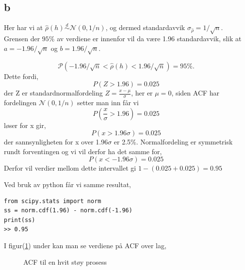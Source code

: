 \documentclass[10pt]{article}
\begin{document}
{\subsection{b}

Her har vi at $\hat{\rho}(h) \stackrel {d}{\sim}  \mathcal{N}(0,1/n)$, og dermed standardavvik $\sigma_{\hat{\rho}} = 1/\sqrt{n}$. Grensen der $95\%$ av verdiene er innenfor vil da være 1.96 standardavvik,
slik at $a = -1.96/\sqrt{n}$ og $b = 1.96/\sqrt{n}$.

\begin{equation}
  \mathcal{P}(-1.96/\sqrt{n} < \hat{\rho}(h) < 1.96/\sqrt{n}) = 95\%.
\end{equation}
Dette fordi,
\begin{equation*}
  P(Z > 1.96) = 0.025
\end{equation*}
der Z er standardnormalfordeling $Z = \frac{x - \mu}{\sigma}$, her er $\mu = 0$, siden ACF har fordelingen $\mathcal{N}(0,1/n)$
setter man inn får vi
\begin{equation*}
  P(\frac{x}{\sigma} > 1.96) = 0.025
\end{equation*}
løser for x gir,
\begin{equation*}
  P(x > 1.96\sigma) = 0.025
\end{equation*}
der sannsynligheten for x over 1.96$\sigma$ er 2.5\%.
Normalfordeling er symmetrisk rundt forventingen og vi vil derfor ha det samme for,
\begin{equation*}
  P(x < -1.96\sigma) = 0.025
\end{equation*}
Derfor vil verdier mellom dette intervallet gi $1 - (0.025 + 0.025)  = 0.95$

Ved bruk av python får vi samme resultat,
\begin{lstlisting}
from scipy.stats import norm
ss = norm.cdf(1.96) - norm.cdf(-1.96)
print(ss)
>> 0.95
\end{lstlisting}

I figur(\ref{ACF}) under kan man se verdiene på ACF over lag,

\begin{figure}[hbt!]
\caption{ACF til en hvit støy prosess}
\label{ACF}
\end{figure}

}
\end{document}
